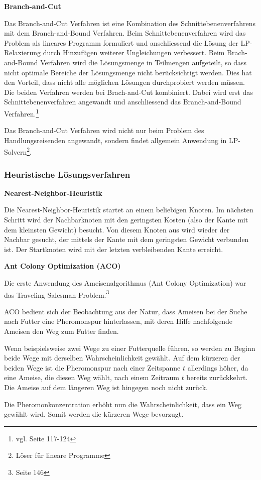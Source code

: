 \documentclass[11pt,a4paper]{article}
\begin{document}
\medskip

\begin{flushleft}
\textbf{Branch-and-Cut}

Das Branch-and-Cut Verfahren ist eine Kombination des Schnittebenenverfahrens mit dem Branch-and-Bound Verfahren. 
Beim Schnittebenenverfahren wird das Problem als lineares Programm formuliert und anschliessend die Lösung der LP-Relaxierung durch Hinzufügen weiterer Ungleichungen verbessert.
Beim Brach-and-Bound Verfahren wird die Lösungsmenge in Teilmengen aufgeteilt, so dass nicht optimale Bereiche der Lösungsmenge nicht berücksichtigt werden. Dies hat den Vorteil, dass nicht alle möglichen Lösungen durchprobiert werden müssen.
Die beiden Verfahren werden bei Brach-and-Cut kombiniert. Dabei wird erst das Schnittebenenverfahren angewandt und anschliessend das Branch-and-Bound Verfahren.\footnote{vgl. \cite{applegate06} Seite 117-124}

Das Branch-and-Cut Verfahren wird nicht nur beim Problem des Handlungsreisenden angewandt, sondern findet allgemein Anwendung in LP-Solvern\footnote{Löser für lineare Programme}.

\end{flushleft}

\subsubsection{Heuristische Lösungsverfahren}
\begin{flushleft}
\textbf{Nearest-Neighbor-Heuristik}

Die Nearest-Neighbor-Heuristik startet an einem beliebigen Knoten. Im nächsten Schritt wird der Nachbarknoten mit den geringsten Kosten (also der Kante mit dem kleinsten Gewicht) besucht. Von diesem Knoten aus wird wieder der Nachbar gesucht, der mittels der Kante  mit dem geringsten Gewicht verbunden ist. Der Startknoten wird mit der letzten verbleibenden Kante erreicht.\cite{gutin02}
\end{flushleft}

\medskip

\begin{flushleft}
\textbf{Ant Colony Optimization (ACO)}

Die erste Anwendung des Ameisenalgorithmus (Ant Colony Optimization) war das Traveling Salesman Problem.\footnote{\cite{dorigo99} Seite 146}

ACO bedient sich der Beobachtung aus der Natur, dass Ameisen bei der Suche nach Futter eine Pheromonspur hinterlassen, mit deren Hilfe nachfolgende Ameisen den Weg zum Futter finden.

Wenn beispielsweise zwei Wege zu einer Futterquelle führen, so werden zu Beginn beide Wege mit derselben Wahrscheinlichkeit gewählt. Auf dem kürzeren der beiden Wege ist die Pheromonspur nach einer Zeitspanne $t$ allerdings höher, da eine Ameise, die diesen Weg wählt, nach einem Zeitraum $t$ bereits zurückkehrt. Die Ameise auf dem längeren Weg ist hingegen noch nicht zurück.

Die Pheromonkonzentration erhöht nun die Wahrscheinlichkeit, dass ein Weg gewählt wird. Somit werden die kürzeren Wege bevorzugt. \cite{dorigo99}

\end{flushleft}
\end{document}
